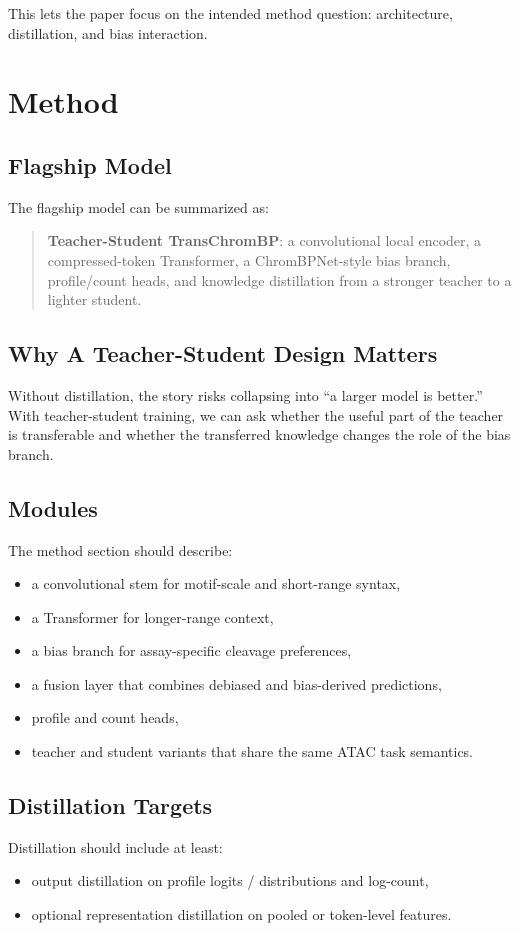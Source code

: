 \documentclass[11pt]{article}
\begin{document}
This lets the paper focus on the intended method question: architecture,
distillation, and bias interaction.

\section{Method}

\subsection{Flagship Model}
The flagship model can be summarized as:
\begin{quote}
\textbf{Teacher-Student TransChromBP}: a convolutional local encoder, a
compressed-token Transformer, a ChromBPNet-style bias branch, profile/count
heads, and knowledge distillation from a stronger teacher to a lighter student.
\end{quote}

\subsection{Why A Teacher-Student Design Matters}
Without distillation, the story risks collapsing into ``a larger model is
better.'' With teacher-student training, we can ask whether the useful part of
the teacher is transferable and whether the transferred knowledge changes the
role of the bias branch.

\subsection{Modules}
The method section should describe:
\begin{itemize}[leftmargin=2em]
  \item a convolutional stem for motif-scale and short-range syntax,
  \item a Transformer for longer-range context,
  \item a bias branch for assay-specific cleavage preferences,
  \item a fusion layer that combines debiased and bias-derived predictions,
  \item profile and count heads,
  \item teacher and student variants that share the same ATAC task semantics.
\end{itemize}

\subsection{Distillation Targets}
Distillation should include at least:
\begin{itemize}[leftmargin=2em]
  \item output distillation on profile logits / distributions and log-count,
  \item optional representation distillation on pooled or token-level features.
\end{itemize}
\end{document}
